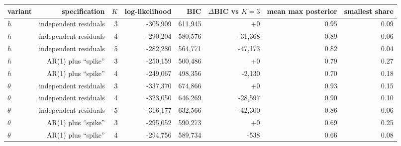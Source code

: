 \begin{tabular}{lrrrrrrr}
\toprule
variant & specification & $K$ & log-likelihood & BIC & $\Delta$BIC vs $K=3$ & mean max posterior & smallest share \\
\midrule
$h$ & independent residuals & 3 & -305,909 & 611,945 & +0 & 0.95 & 0.09 \\
$h$ & independent residuals & 4 & -290,204 & 580,576 & -31,368 & 0.89 & 0.06 \\
$h$ & independent residuals & 5 & -282,280 & 564,771 & -47,173 & 0.82 & 0.04 \\
$h$ & AR(1) plus ``spike'' & 3 & -250,159 & 500,486 & +0 & 0.79 & 0.27 \\
$h$ & AR(1) plus ``spike'' & 4 & -249,067 & 498,356 & -2,130 & 0.70 & 0.18 \\
$\theta$ & independent residuals & 3 & -337,370 & 674,866 & +0 & 0.93 & 0.15 \\
$\theta$ & independent residuals & 4 & -323,050 & 646,269 & -28,597 & 0.90 & 0.10 \\
$\theta$ & independent residuals & 5 & -316,177 & 632,566 & -42,300 & 0.86 & 0.06 \\
$\theta$ & AR(1) plus ``spike'' & 3 & -295,052 & 590,273 & +0 & 0.69 & 0.25 \\
$\theta$ & AR(1) plus ``spike'' & 4 & -294,756 & 589,734 & -538 & 0.66 & 0.08 \\
\bottomrule
\end{tabular}
